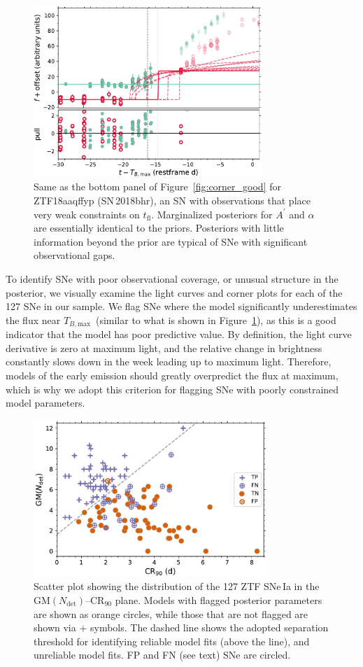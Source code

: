 \documentclass[twocolumn]{./aastex63}
\newcommand{\tfl}{$t_\mathrm{fl}$}
\newcommand{\tbmax}{$T_{B,\mathrm{max}}$}
\begin{document}
\begin{figure}
    \centering
    \includegraphics[width=3.4in]{./figures/ZTF18aaqffyp_model_lc.pdf}
    \caption{Same as the bottom panel of Figure~\ref{fig:corner_good} for
    ZTF18aaqffyp (SN\,2018bhr), an SN with observations that place very weak
    constraints on \tfl. Marginalized posteriors for $A^\prime$ and
    $\alpha$ are essentially identical to the priors. Posteriors with little
    information beyond the prior are typical of SNe with significant
    observational gaps.}
    \label{fig:biggap_lc}
\end{figure}

To identify SNe with poor observational coverage, or unusual structure in the
posterior, we visually examine the light curves and corner plots for each of
the 127 SNe in our sample. We flag SNe where the model significantly
underestimates the flux near \tbmax\ (similar to what is shown in
Figure~\ref{fig:biggap_lc}), as this is a good indicator that the model has
poor predictive value. By definition, the light curve derivative is zero at
maximum light, and the relative change in brightness constantly slows down in
the week leading up to maximum light. Therefore, models of the early
emission should greatly overpredict the flux at maximum, which is why we
adopt this criterion for flagging SNe with poorly constrained model
parameters.

\begin{figure}
    \centering
    \includegraphics[width=3.5in]{./figures/final_sample.pdf}
    \caption{Scatter plot showing the distribution of the 127 ZTF SNe\,Ia in
    the $\mathrm{GM}(N_\mathrm{det})$--$\mathrm{CR}_{90}$ plane. Models with
    flagged posterior parameters are shown as orange circles, while those
    that are not flagged are shown via $+$ symbols. The dashed line shows the
    adopted separation threshold for identifying reliable model fits (above
    the line), and unreliable model fits. FP and FN (see text) SNe are
    circled. }
    \label{fig:flagged_sn}
\end{figure}
\end{document}
